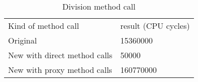 \begin{table}[ht]
\centering
\caption{Division method call}
\label{tab:table2}
\begin{tabular}{ll}
\hline\noalign{\smallskip}
Kind of method call & result (CPU cycles)\\
\noalign{\smallskip}
\hline
\noalign{\smallskip}
Original & 15360000\\
New with direct method calls & 50000\\
New with proxy method calls & 160770000\\
\hline
\end{tabular}

\end{table}


